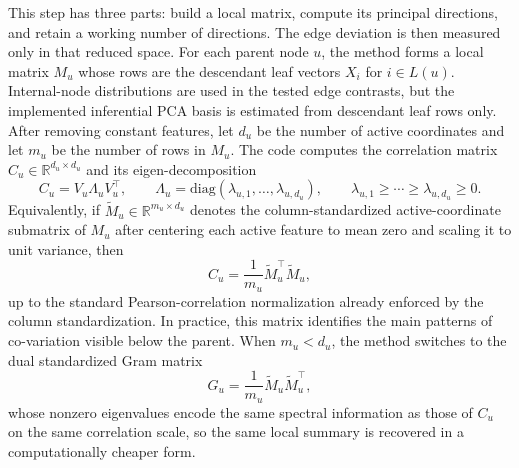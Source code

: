 This step has three parts: build a local matrix, compute its principal
directions, and retain a working number of directions. The edge deviation is
then measured only in that reduced space. For each parent node $u$, the method
forms a local matrix $M_u$ whose rows are the descendant leaf vectors $X_i$ for
$i \in L(u)$. Internal-node distributions are used in the tested edge
contrasts, but the implemented inferential PCA basis is estimated from
descendant leaf rows only.
After removing constant features, let $d_u$ be the number of active
coordinates and let $m_u$ be the number of rows in $M_u$. The code computes the
correlation matrix
$C_u \in \mathbb{R}^{d_u \times d_u}$ and its eigen-decomposition
\begin{equation}
C_u = V_u \Lambda_u V_u^\top,
\qquad
\Lambda_u = \mathrm{diag}(\lambda_{u,1},\dots,\lambda_{u,d_u}),
\qquad
\lambda_{u,1} \ge \cdots \ge \lambda_{u,d_u} \ge 0.
\end{equation}
Equivalently, if $\widetilde{M}_u \in \mathbb{R}^{m_u \times d_u}$ denotes the
column-standardized active-coordinate submatrix of $M_u$ after centering each
active feature to mean zero and scaling it to unit variance, then
\begin{equation}
C_u = \frac{1}{m_u}\widetilde{M}_u^\top \widetilde{M}_u,
\end{equation}
up to the standard Pearson-correlation normalization already enforced by the
column standardization. In practice, this matrix identifies the main patterns
of co-variation visible below the parent. When $m_u < d_u$, the method
switches to the dual standardized Gram matrix
\begin{equation}
G_u = \frac{1}{m_u}\widetilde{M}_u \widetilde{M}_u^\top,
\end{equation}
whose nonzero eigenvalues encode the same spectral information as those of
$C_u$ on the same correlation scale, so the same local summary is recovered in
a computationally cheaper form.

